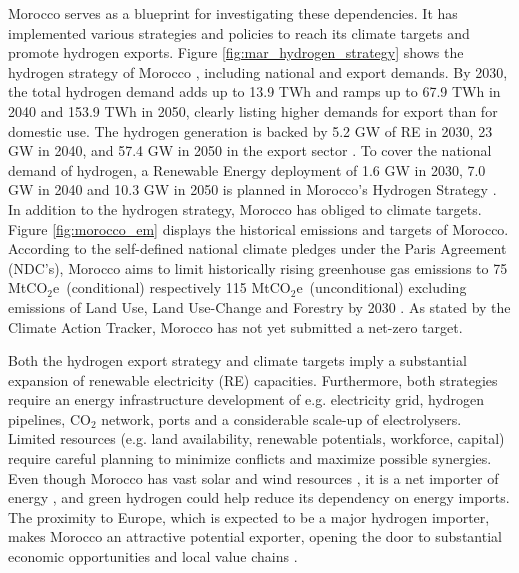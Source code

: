 \documentclass[5p,numafflabel]{elsarticle}
\def\coe{CO${}_2$e}
\begin{document}
Morocco serves as a blueprint for investigating these dependencies. It has implemented various strategies and policies to reach its climate targets and promote hydrogen exports. Figure \ref{fig:mar_hydrogen_strategy} shows the hydrogen strategy of Morocco \cite{MarHyStrat2021}, including national and export demands. By 2030, the total hydrogen demand adds up to 13.9 TWh and ramps up to 67.9 TWh in 2040 and 153.9 TWh in 2050, clearly listing higher demands for export than for domestic use. The hydrogen generation is backed by 5.2 GW of RE in 2030, 23 GW in 2040, and 57.4 GW in 2050 in the export sector \cite{MarHyStrat2021}. To cover the national demand of hydrogen, a Renewable Energy deployment of 1.6 GW in 2030, 7.0 GW in 2040 and 10.3 GW in 2050 is planned in Morocco's Hydrogen Strategy \cite{MarHyStrat2021}. In addition to the hydrogen strategy, Morocco has obliged to climate targets. Figure \ref{fig:morocco_em} displays the historical emissions and targets of Morocco.
According to the self-defined national climate pledges under the Paris Agreement (NDC's), Morocco aims to limit historically rising greenhouse gas emissions to 75 Mt\coe\ (conditional) respectively 115 Mt\coe\ (unconditional) excluding emissions of Land Use, Land Use-Change and Forestry by 2030 \cite{CAT2021}. 
As stated by the Climate Action Tracker\cite{CAT2021}, Morocco has not yet submitted a net-zero target. 

Both the hydrogen export strategy and climate targets imply a substantial expansion of renewable electricity (RE) capacities. Furthermore, both strategies require an energy infrastructure development of e.g. electricity grid, hydrogen pipelines, $\mathrm{CO_2}$ network, ports and a considerable scale-up of electrolysers.
Limited resources (e.g. land availability, renewable potentials, workforce, capital) require careful planning to minimize conflicts and maximize possible synergies. Even though Morocco has vast solar and wind resources \cite{Peters2023, Touili2018, Sterl2022}, it is a net importer of energy \cite{IEA2022}, and green hydrogen could help reduce its dependency on energy imports. The proximity to Europe, which is expected to be a major hydrogen importer, makes Morocco an attractive potential exporter, opening the door to substantial economic opportunities and local value chains \cite{Ersoy2022}.
\end{document}
